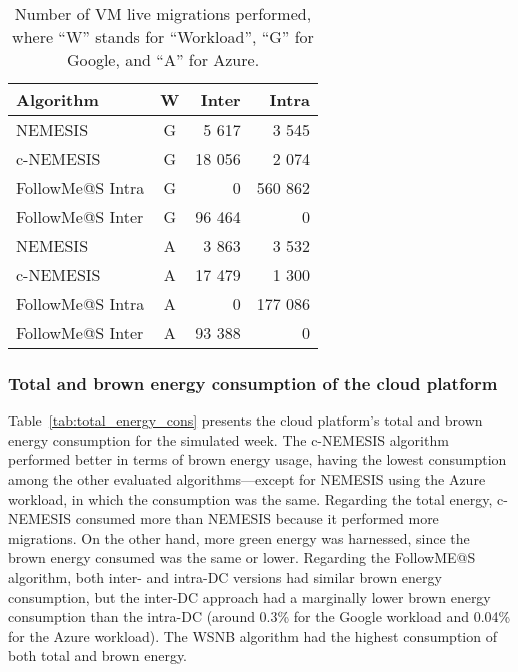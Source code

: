 \begin{table}[!ht]
\caption{Number of VM live migrations performed, where ``W'' stands for ``Workload'', ``G'' for Google, and ``A'' for Azure. }\label{tab:amount_migs} \centering
\begin{tabular}{|l|c|r|r|}
  \hline
  \textbf{Algorithm} & \textbf{W}  & \textbf{Inter} & \textbf{Intra}   \\
  \hline
  NEMESIS  & G & 5 617  & 3 545 \\
  \hline
  c-NEMESIS & G & 18 056  & 2 074 \\
  \hline
  FollowMe@S Intra  & G & 0  & 560 862 \\
  \hline
  FollowMe@S Inter  & G & 96 464 & 0 \\
  \hline
  NEMESIS & A & 3 863 & 3 532 \\
  \hline
  c-NEMESIS & A & 17 479  & 1 300 \\
  \hline
  FollowMe@S Intra  & A & 0  & 177 086 \\
  \hline
  FollowMe@S Inter   & A & 93 388 & 0 \\
  \hline
\end{tabular}
\end{table}

\subsubsection{Total and brown energy consumption of the cloud platform}

Table~\ref{tab:total_energy_cons} presents the cloud platform's total and brown energy consumption for the simulated week. The c-NEMESIS algorithm performed better in terms of brown energy usage, having the lowest consumption among the other evaluated algorithms---except for NEMESIS using the Azure workload, in which the consumption was the same. Regarding the total energy, c-NEMESIS consumed more than NEMESIS because it performed more migrations. On the other hand, more green energy was harnessed, since the brown energy consumed was the same or lower. Regarding the FollowME@S algorithm, both inter- and intra-DC versions had similar brown energy consumption, but the inter-DC approach had a marginally lower brown energy consumption than the intra-DC (around 0.3\% for the Google workload and 0.04\% for the Azure workload). The WSNB algorithm had the highest consumption of both total and brown energy.

